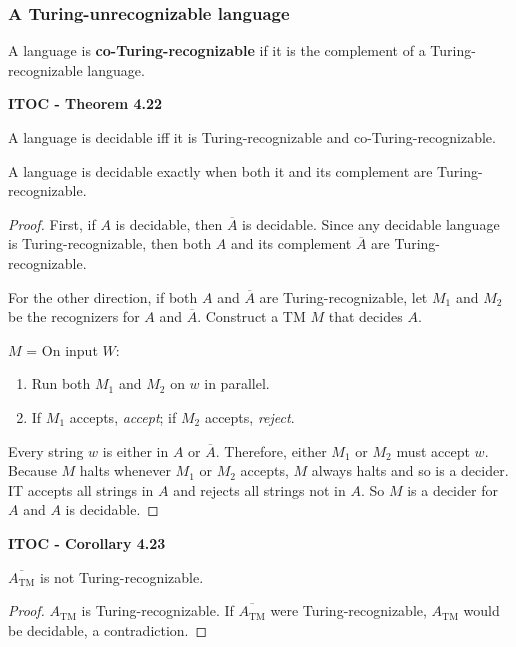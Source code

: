\subsubsection{A Turing-unrecognizable language}

A language is \textbf{co-Turing-recognizable} if it is the complement of a Turing-recognizable language.

\begin{shaded}
\textbf{ITOC - Theorem 4.22}

\medskip
A language is decidable iff it is Turing-recognizable and co-Turing-recognizable.
\end{shaded}

{\color{blue} A language is decidable exactly when both it and its complement are Turing-recognizable.}

\begin{mdframed}
\begin{proof}
First, if $A$ is decidable, then $\overline{A}$ is decidable. Since any decidable language is Turing-recognizable, then both $A$ and its complement $\overline{A}$ are Turing-recognizable.

For the other direction, if both $A$ and $\overline{A}$ are Turing-recognizable, let $M_1$ and $M_2$ be the recognizers for $A$ and $\overline{A}$. Construct a TM $M$ that decides $A$.

\medskip
$M$ = On input $W$:
\begin{enumerate}
\item Run both $M_1$ and $M_2$ on $w$ in parallel.
\item If $M_1$ accepts, \textit{accept}; if $M_2$ accepts, \textit{reject}.
\end{enumerate}

Every string $w$ is either in $A$ or $\overline{A}$. Therefore, either $M_1$ or $M_2$ must accept $w$. Because $M$ halts whenever $M_1$ or $M_2$ accepts, $M$ always halts and so is a decider. IT accepts all strings in $A$ and rejects all strings not in $A$. So $M$ is a decider for $A$ and $A$ is decidable.
\end{proof}
\end{mdframed}

\label{lang:ATMC_NTR}
\begin{shaded}
\textbf{ITOC - Corollary 4.23}

\medskip
$\overline{A_\text{TM}}$ is not Turing-recognizable.
\end{shaded}

\begin{mdframed}
\begin{proof}
$A_\text{TM}$ is Turing-recognizable. If $\overline{A_\text{TM}}$ were Turing-recognizable, $A_\text{TM}$ would be decidable, a contradiction.
\end{proof}
\end{mdframed}